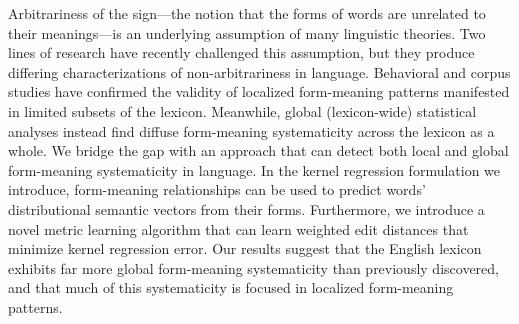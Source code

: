 Arbitrariness of the sign---the notion that the forms of words are unrelated to their meanings---is an underlying assumption of many linguistic theories.  Two lines of research have recently challenged this assumption, but they produce differing characterizations of non-arbitrariness in language.  Behavioral and corpus studies have confirmed the validity of localized form-meaning patterns manifested in limited subsets of the lexicon.  Meanwhile, global (lexicon-wide) statistical analyses instead find diffuse form-meaning systematicity across the lexicon as a whole. We bridge the gap with an approach that can detect both local and global form-meaning systematicity in language.  In the kernel regression formulation we introduce, form-meaning relationships can be used to predict words' distributional semantic vectors from their forms.  Furthermore, we introduce a novel metric learning algorithm that can learn weighted edit distances that minimize kernel regression error.  Our results suggest that the English lexicon exhibits far more global form-meaning systematicity than previously discovered, and that much of this systematicity is focused in localized form-meaning patterns.
